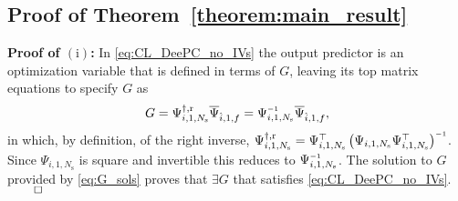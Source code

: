 \subsection{Proof of Theorem~\ref{theorem:main_result}}
\noindent\textbf{Proof of $(\mathrm{i})$:} In \eqref{eq:CL_DeePC_no_IVs} the output predictor is an optimization variable that is defined in terms of $G$, leaving its top matrix equations to specify $G$ as
\begin{align}\label{eq:G_sols}
    G = \Psi_{i,1,N_\mathrm{s}}^{\dagger,\mathrm{r}}\overline{\Psi}_{\hat{i},1,f} = \Psi_{i,1,N_\mathrm{s}}\inv\overline{\Psi}_{\hat{i},1,f},
\end{align}
in which, by definition, of the right inverse, $\Psi_{i,1,N_\mathrm{s}}^{\dagger,\mathrm{r}}=\Psi_{i,1,N_\mathrm{s}}^\top \left(\Psi_{i,1,N_\mathrm{s}}\Psi_{i,1,N_\mathrm{s}}^\top\right)\inv$. Since $\Psi_{i,1,N_\mathrm{s}}$ is square and invertible this reduces to $\Psi_{i,1,N_\mathrm{s}}\inv$. The solution to $G$ provided by \eqref{eq:G_sols} proves that $\exists G$ that satisfies \eqref{eq:CL_DeePC_no_IVs}. $\hfill\qed$
% 

